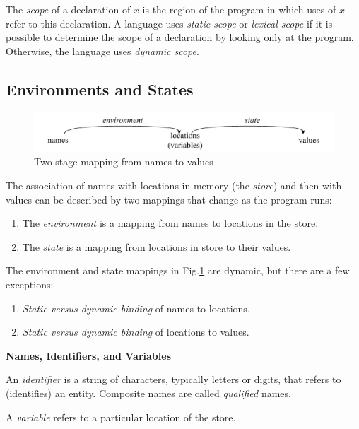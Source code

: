 \documentclass[a4paper,twoside]{book}
\begin{document}
The \textit{scope} of a declaration of $x$ is the region of the program in which uses of $x$ refer to this declaration. A language uses \textit{static scope} or \textit{lexical scope} if it is possible to determine the scope of a declaration by looking only at the program. Otherwise, the language uses \textit{dynamic scope}.

\subsection{Environments and States}

\begin{figure}[htbp]
    \centering
    \includegraphics[width=\linewidth]{Figure1 8.pdf}
    \caption{Two-stage mapping from names to values}
    \label{figure:1.8}
\end{figure}

The association of names with locations in memory (the \textit{store}) and then with values can be described by two mappings that change as the program runs:
\begin{enumerate}
    \item The \textit{environment} is a mapping from names to locations in the store.
    \item The \textit{state} is a mapping from locations in store to their values.
\end{enumerate}

The environment and state mappings in Fig.\;\ref{figure:1.8} are dynamic, but there are a few exceptions:
\begin{enumerate}
    \item \textit{Static versus dynamic binding} of names to locations.
    \item \textit{Static versus dynamic binding} of locations to values.
\end{enumerate}

\begin{framed}
\begin{center}
    \textbf{{\large Names, Identifiers, and Variables}}
\end{center}

An \textit{identifier} is a string of characters, typically letters or digits, that refers to (identifies) an entity. Composite names are called \textit{qualified} names.

A \textit{variable} refers to a particular location of the store.
\end{framed}
\end{document}

